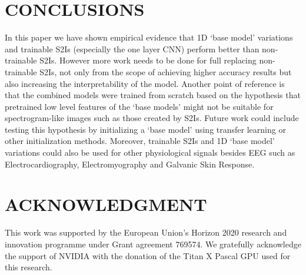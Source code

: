 \documentclass[conference]{IEEEtran}
\begin{document}
\section{CONCLUSIONS}
In this paper we have shown empirical evidence that 1D `base model' variations and trainable S2Is (especially the one layer CNN) perform better than non-trainable S2Is.
However more work needs to be done for full replacing non-trainable S2Is, not only from the scope of achieving higher accuracy results but also increasing the interpretability of the model.
Another point of reference is that the combined models were trained from scratch based on the hypothesis that pretrained low level features of the `base models' might not be suitable for spectrogram-like images such as those created by S2Is.
Future work could include testing this hypothesis by initializing a `base model' using transfer learning or other initialization methods.
Moreover, trainable S2Is and 1D `base model' variations could also be used for other physiological signals besides EEG such as Electrocardiography, Electromyography and Galvanic Skin Response.

\section*{ACKNOWLEDGMENT}
This work was supported by the European Union's Horizon 2020 research and innovation programme under Grant agreement 769574.
We gratefully acknowledge the support of NVIDIA with the donation of the Titan X Pascal GPU used for this research.



\end{document}
